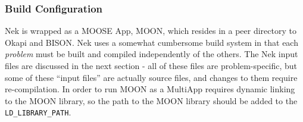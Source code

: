 \documentclass[10pt]{article}
\numberwithin{equation}{section} %
\begin{document}

\subsubsection{Build Configuration}
\label{sec:BuildConfig}
Nek is wrapped as a MOOSE App, MOON, which resides in a peer directory to Okapi and BISON. Nek uses a somewhat cumbersome build system in that each {\it problem} must be built and compiled independently of the others. The Nek input files are discussed in the next section - all of these files are problem-specific, but some of these ``input files'' are actually source files, and changes to them require re-compilation. In order to run MOON as a MultiApp requires dynamic linking to the MOON library, so the path to the MOON library should be added to the {\tt LD\_LIBRARY\_PATH}.
\end{document}
